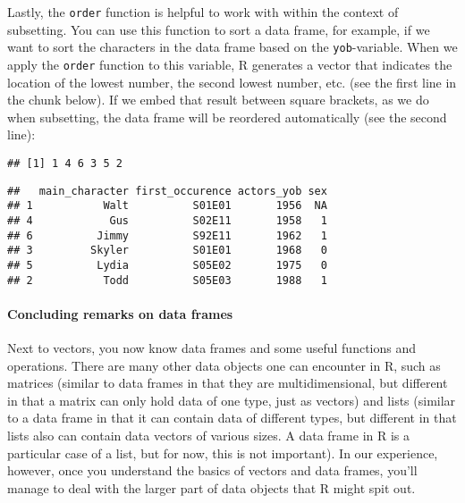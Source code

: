 \documentclass[
]{article}
\newenvironment{Shaded}{\begin{snugshade}}{\end{snugshade}}
\newcommand{\FunctionTok}[1]{\textcolor[rgb]{0.00,0.00,0.00}{#1}}
\newcommand{\NormalTok}[1]{#1}
\newcommand{\SpecialCharTok}[1]{\textcolor[rgb]{0.00,0.00,0.00}{#1}}
\begin{document}
Lastly, the \texttt{order} function is helpful to work with within the
context of subsetting. You can use this function to sort a data frame,
for example, if we want to sort the characters in the data frame based
on the \texttt{yob}-variable. When we apply the \texttt{order} function
to this variable, R generates a vector that indicates the location of
the lowest number, the second lowest number, etc. (see the first line in
the chunk below). If we embed that result between square brackets, as we
do when subsetting, the data frame will be reordered automatically (see
the second line):

\begin{Shaded}
\end{Shaded}

\begin{verbatim}
## [1] 1 4 6 3 5 2
\end{verbatim}

\begin{Shaded}
\end{Shaded}

\begin{verbatim}
##   main_character first_occurence actors_yob sex
## 1           Walt          S01E01       1956  NA
## 4            Gus          S02E11       1958   1
## 6          Jimmy          S92E11       1962   1
## 3         Skyler          S01E01       1968   0
## 5          Lydia          S05E02       1975   0
## 2           Todd          S05E03       1988   1
\end{verbatim}

\hypertarget{concluding-remarks-on-data-frames}{%
\paragraph{Concluding remarks on data
frames}\label{concluding-remarks-on-data-frames}}

Next to vectors, you now know data frames and some useful functions and
operations. There are many other data objects one can encounter in R,
such as matrices (similar to data frames in that they are
multidimensional, but different in that a matrix can only hold data of
one type, just as vectors) and lists (similar to a data frame in that it
can contain data of different types, but different in that lists also
can contain data vectors of various sizes. A data frame in R is a
particular case of a list, but for now, this is not important). In our
experience, however, once you understand the basics of vectors and data
frames, you'll manage to deal with the larger part of data objects that
R might spit out.
\end{document}
